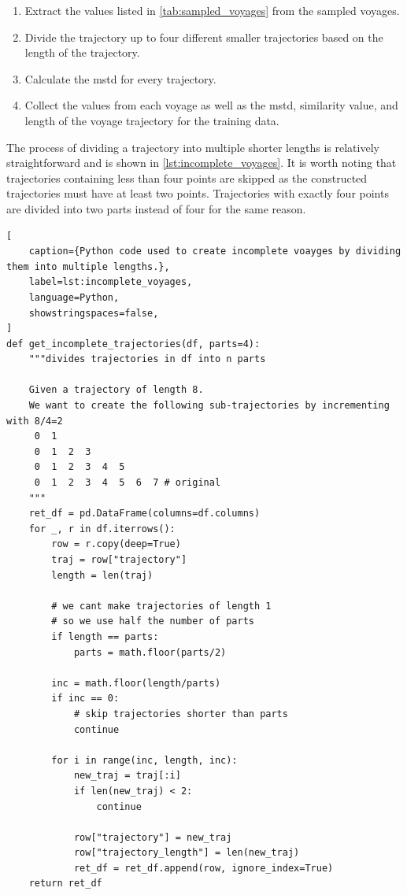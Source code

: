 \begin{enumerate}
    \item Extract the values listed in \cref{tab:sampled_voyages} from the sampled voyages.
    \item Divide the trajectory up to four different smaller trajectories based on the length of the trajectory.
    \item Calculate the \acrshort{mstd} for every trajectory.
    \item Collect the values from each voyage as well as the \acrshort{mstd}, similarity value, and length of the voyage trajectory for the training data.
\end{enumerate}

The process of dividing a trajectory into multiple shorter lengths is relatively straightforward and is shown in \cref{lst:incomplete_voyages}. It is worth noting that trajectories containing less than four points are skipped as the constructed trajectories must have at least two points. Trajectories with exactly four points are divided into two parts instead of four for the same reason.

\begin{lstlisting}[
    caption={Python code used to create incomplete voayges by dividing them into multiple lengths.},
    label=lst:incomplete_voyages,
    language=Python,
    showstringspaces=false,
]
def get_incomplete_trajectories(df, parts=4):
    """divides trajectories in df into n parts

    Given a trajectory of length 8.
    We want to create the following sub-trajectories by incrementing with 8/4=2
     0  1
     0  1  2  3
     0  1  2  3  4  5
     0  1  2  3  4  5  6  7 # original
    """
    ret_df = pd.DataFrame(columns=df.columns)
    for _, r in df.iterrows():
        row = r.copy(deep=True)
        traj = row["trajectory"]
        length = len(traj)

        # we cant make trajectories of length 1
        # so we use half the number of parts
        if length == parts:
            parts = math.floor(parts/2)

        inc = math.floor(length/parts)
        if inc == 0:
            # skip trajectories shorter than parts
            continue

        for i in range(inc, length, inc):
            new_traj = traj[:i]
            if len(new_traj) < 2:
                continue

            row["trajectory"] = new_traj
            row["trajectory_length"] = len(new_traj)
            ret_df = ret_df.append(row, ignore_index=True)
    return ret_df
\end{lstlisting}

